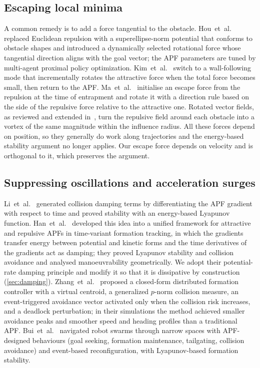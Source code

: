 \documentclass[11pt]{article}
\theoremstyle{definition}
\theoremstyle{remark}
\begin{document}
\subsection{Escaping local minima}
A common remedy is to add a force tangential to the obstacle. Hou~et~al.~\cite{hou2026irapf}
replaced Euclidean repulsion with a superellipse-norm potential that conforms to
obstacle shapes and introduced a dynamically selected rotational force whose
tangential direction aligns with the goal vector; the APF parameters are tuned
by multi-agent proximal policy optimization. Kim~et~al.~\cite{kim2024wallfollower}
switch to a wall-following mode that incrementally rotates the attractive force
when the total force becomes small, then return to the APF. Ma~et~al.~\cite{ma2025sa}
initialise an escape force from the repulsion at the time of entrapment and
rotate it with a direction rule based on the side of the repulsive force
relative to the attractive one. Rotated vector fields, as reviewed and extended in~\cite{manteaux2024rapf},
turn the repulsive field around each obstacle into a vortex of the same
magnitude within the influence radius. All these forces depend on position, so
they generally do work along trajectories and the energy-based stability
argument no longer applies. Our escape force depends on velocity and is
orthogonal to it, which preserves the argument.

\subsection{Suppressing oscillations and acceleration surges}
Li~et~al.~\cite{li2024lowosc} generated collision damping terms by
differentiating the APF gradient with respect to time and proved stability with
an energy-based Lyapunov function. Han~et~al.~\cite{han2025time} developed this
idea into a unified framework for attractive and repulsive APFs in
time-variant formation tracking, in which the gradients transfer energy between
potential and kinetic forms and the time derivatives of the gradients act as
damping; they proved Lyapunov stability and collision avoidance and analysed
manoeuvrability geometrically. We adopt their potential-rate damping principle
and modify it so that it is dissipative by construction (\cref{sec:damping}).
Zhang~et~al.~\cite{zhang2026closedform} proposed a closed-form distributed
formation controller with a virtual centroid, a generalized $p$-norm collision
measure, an event-triggered avoidance vector activated only when the collision
risk increases, and a deadlock perturbation; in their simulations the method
achieved smaller avoidance peaks and smoother speed and heading profiles than a
traditional APF. Bui~et~al.~\cite{bui2025event} navigated robot swarms through
narrow spaces with APF-designed behaviours (goal seeking, formation
maintenance, tailgating, collision avoidance) and event-based reconfiguration,
with Lyapunov-based formation stability.
\end{document}
